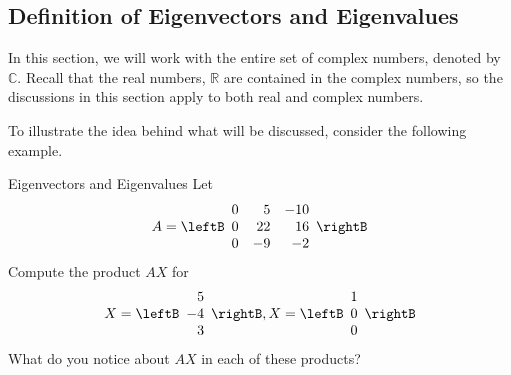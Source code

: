\subsection{Definition of Eigenvectors and Eigenvalues}

In this section, we will work with the entire set of complex numbers, 
denoted by $\mathbb{C}$. Recall that the real numbers, $\mathbb{R}$ are 
contained in the complex numbers, so the discussions in this section 
apply to both real and complex numbers. 

To illustrate the idea behind what will be discussed, consider the following
example.

\begin{example}{Eigenvectors and Eigenvalues}\label{exa:eigenvectorsandeigenvalues}
Let
\begin{equation*}
A = \leftB
\begin{array}{rrr}
0 & 5 & -10 \\
0 & 22 & 16 \\
0 & -9 & -2
\end{array}
\rightB 
\end{equation*}
Compute the product $AX$ for 
\begin{equation*}
X = \leftB
\begin{array}{r}
5 \\
-4 \\
 3
\end{array}
\rightB, X = \leftB
\begin{array}{r}
1 \\
0 \\
0
\end{array}
\rightB
\end{equation*}
What do you notice about $AX$ in each of these products? 
\end{example}

